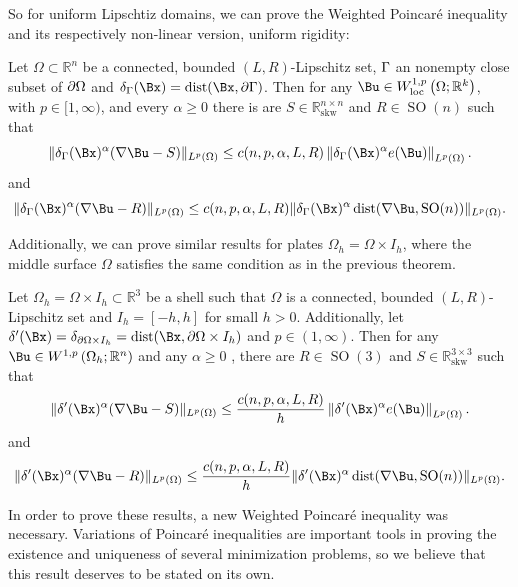 So for uniform Lipschtiz domains, we can prove the Weighted Poincaré inequality and its respectively non-linear version, uniform rigidity:
\begin{theorem} \label{KornGamma} Let $\Omega \subset \mathbb{R}^n$ be a connected, bounded $(L, R)$-Lipschitz set,  $\Gamma$ an nonempty  close subset of $\partial\Omega$ and $\delta_\GG(\Bx)=\dist(\Bx, \partial\GG)$. Then for any $\Bu \in W_{\mathrm{loc}}^{1, p}\left(\Omega ; \mathbb{R}^k\right)$, with $p \in[1, \infty)$, and every $\alpha\geq0$ there is are  $S \in \mathbb{R}_{\mathrm{skw}}^{n \times n}$ and $R \in \operatorname{SO}(n)$  such that
$$
\|\delta_\GG(\Bx)^\alpha(\nabla \Bu-S)\|_{L^p(\Omega)} \leq  c(n,p,\alpha,L,R)\left\|\delta_\GG(\Bx)^\alpha e(\Bu)\right\|_{L^p(\Omega)}.
$$
and
$$
\|\delta_\GG(\Bx)^\alpha(\nabla \Bu-R)\|_{L^p(\Omega)} \leq c(n,p,\alpha, L,R)\|\delta_\GG(\Bx)^\alpha\operatorname{dist}(\nabla \Bu, \operatorname{SO}(n))\|_{L^p(\Omega)}.
$$
\end{theorem}



Additionally, we can prove similar results for plates $\Omega_h=\Omega\times I_h$, where the middle surface $\Omega$ satisfies the same condition as in the previous theorem.

\begin{theorem} \label{KornGammaPlate} Let $\Omega_h=\Omega\times I_h \subset \mathbb{R}^3$ be a shell such that $\Omega$ is  a connected, bounded $(L, R)$-Lipschitz set and $I_h=[-h,h]$ for small $h>0$. Additionally, let $\delta'(\Bx)=\delta_{\dOm\times I_h}=\dist(\Bx,\dOm\times I_h)$ and $p \in(1, \infty)$. Then for any $\Bu \in W^{1, p}\left(\Omega_h ; \mathbb{R}^n\right)$ and any $\alpha\geq 0 $ , there are $R \in \operatorname{SO}(3)$ and $S \in \mathbb{R}_{\mathrm{skw}}^{3 \times 3}$ such that
$$
\|\delta'(\Bx)^\alpha(\nabla \Bu-S)\|_{L^p(\Omega)} \leq  \frac{c(n,p,\alpha,L,R)}{h}\left\|\delta'(\Bx)^\alpha e(\Bu)\right\|_{L^p(\Omega)}.
$$
and
$$
\|\delta'(\Bx)^\alpha(\nabla \Bu-R)\|_{L^p(\Omega)} \leq \frac{c(n,p,\alpha,L,R)}{h}\|\delta'(\Bx)^\alpha\operatorname{dist}(\nabla \Bu, \operatorname{SO}(n))\|_{L^p(\Omega)}.
$$
\end{theorem}


In order to prove these results, a new Weighted Poincaré inequality was necessary. Variations of Poincaré inequalities are important tools in proving the existence and uniqueness of several minimization problems, so we believe that this result deserves to be stated on its own.

